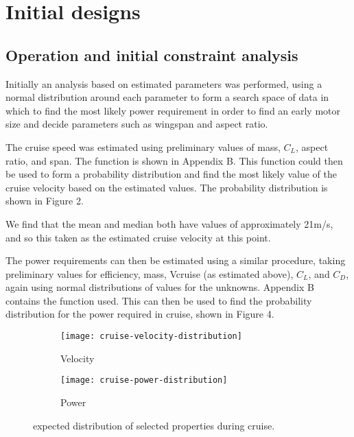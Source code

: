 \documentclass[../../main.tex]{subfiles}
\begin{document}

\section{Initial designs} \label{sec:design-process:initial-designs}

\subsection{Operation and initial constraint analysis} \label{sec:design-process:initial-designs:operation-and-initial-constraint-analysis}

Initially an analysis based on estimated parameters was performed, using a normal distribution around each parameter to form a search space of data in which to find the most likely power requirement in order to find an early motor size and decide parameters such as wingspan and aspect ratio. 

The cruise speed was estimated using preliminary values of mass, $C_L$, aspect ratio, and span. The function is shown in Appendix B.
This function could then be used to form a probability distribution and find the most likely value of the cruise velocity based on the estimated values.
The probability distribution is shown in Figure 2.

We find that the mean and median both have values of approximately 21m/s, and so this taken as the estimated cruise velocity at this point. 

The power requirements can then be estimated using a similar procedure, taking preliminary values for efficiency, mass, Vcruise (as estimated above), $C_L$, and $C_D$, again using normal distributions of values for the unknowns.
Appendix B contains the function used.
This can then be used to find the probability distribution for the power required in cruise, shown in Figure 4.

\begin{figure}[H]
    \centering
    \begin{subfigure}[b]{0.49\columnwidth}
        \centering
        \texttt{[image: cruise-velocity-distribution]}
        \caption{Velocity}
        \label{fig:cruise-distribution:velocity}
    \end{subfigure}
    \hfill
    \begin{subfigure}[b]{0.49\columnwidth}
        \centering
        \texttt{[image: cruise-power-distribution]}
        \caption{Power}
        \label{fig:cruise-distribution:power}
    \end{subfigure}
    \caption{expected distribution of selected properties during cruise.}
    \label{fig:cruise-distribution}
\end{figure}
\end{document}
